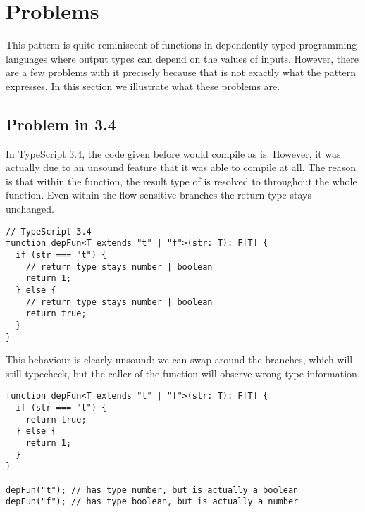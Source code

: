 \section{Problems}
\label{sec:problems}

This pattern is quite reminiscent of functions in dependently typed programming languages where output types can depend on the values of inputs. However, there are a few problems with it precisely because that is not exactly what the pattern expresses. In this section we illustrate what these problems are.

\subsection{Problem in 3.4}

In TypeScript 3.4, the  code given before would compile as is. However, it was actually due to an unsound feature that it was able to compile at all. The reason is that within the function, the result type of  is resolved to  throughout the whole function. Even within the flow-sensitive branches the return type stays unchanged.

\begin{lstlisting}
// TypeScript 3.4
function depFun<T extends "t" | "f">(str: T): F[T] {
  if (str === "t") {
    // return type stays number | boolean
    return 1;
  } else {
    // return type stays number | boolean
    return true;
  }
}
\end{lstlisting}

This behaviour is clearly unsound: we can swap around the branches, which will still typecheck, but the caller of the function will observe wrong type information.

\begin{lstlisting}
function depFun<T extends "t" | "f">(str: T): F[T] {
  if (str === "t") {
    return true;
  } else {
    return 1;
  }
}

depFun("t"); // has type number, but is actually a boolean
depFun("f"); // has type boolean, but is actually a number
\end{lstlisting}


